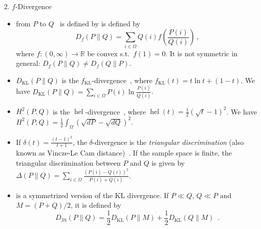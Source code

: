 \documentclass[final]{beamer}
\DeclareMathOperator{\hel}{hel}
\newcommand{\kl}[2]{D_{\mathrm{KL}}( #1 \parallel #2 )}
\newcommand{\js}[2]{D_{\mathrm{JS}}( #1 \parallel #2 )}
\newlength{\onecolwid}
\begin{document}
\begin{frame}[t]
\begin{columns}[t]
\begin{column}{\onecolwid}
		
	\begin{block}{2. $ f $-Divergence}
\begin{itemize}	
		\item	{}  from $ P $ 
		to $ Q $~\cite{csiszar1964informationstheoretische} is defined by 
			is defined by
			\begin{equation}\label{eq:definition_f_divergence}
			D_f(P\parallel Q) = \sum_{i\in \Omega} Q(i) f\left( 
			\frac{P(i)}{Q(i)} 
			\right) \,,
			\end{equation}
			where $ f:(0,\infty)\to 
			\mathbb{R} $ be convex s.t.\ 
			$ f(1)=0 
			$. 
			It is not symmetric in general: $ D_f(P\parallel 
			Q)\ne 
			D_f(Q\parallel P) $.
			
			\item {} $ \kl{P}{Q} $ is the $ 
			f_{\mathrm{KL}} 
			$-divergence~\cite{cover2012elements}, where
			 $ f_{\mathrm{KL}}(t) = t\ln t + (1-t) $.
			We have
			$
			\kl{P}{Q} = \sum_{i\in \Omega} P(i) \ln\frac{P(i)}{Q(i)} 
			$.
			
		\item	{} $ H^2(P,Q) $ is 
		the $ \hel 
		$-divergence~\cite{daskalakis2017square}, where
			 $ \hel(t)=\frac{1}{2}(\sqrt{t}-1)^2 $.
			 We have
			$
			H^2(P,Q) = \frac{1}{2} \int_{\Omega} 
			(\sqrt{dP}-\sqrt{dQ})^2$.	
		\item  {}
			If $ \delta(t) = \frac{(t-1)^2}{t+1} $, the $ \delta $-divergence 
			is the 
			\emph{triangular discrimination} (also known as Vincze-Le Cam 
			distance)~\citep{le2012asymptotic,vincze1981concept}. If the sample 
			space is 
			finite, the triangular discrimination between $ P $ and $ Q $ is 
			given by 
			$\Delta(P\parallel Q) = \sum_{i\in \Omega} 
			\frac{(P(i)-Q(i))^2}{P(i)+Q(i)}$.
			
		\item {}
			 is a symmetrized version 
			of the 
			KL divergence. If $ P\ll Q $, $ Q\ll P $ and $ M=(P+Q)/2 $, it 
			is defined by
			\begin{equation}\label{eq:jensen-shannon}
			\js{P}{Q} = \frac{1}{2} \kl{P}{M} + \frac{1}{2} \kl{Q}{M}\enspace.
			\end{equation}
\end{itemize}
	\end{block}
			

\end{column}
\end{columns}
\end{frame}
\end{document}
